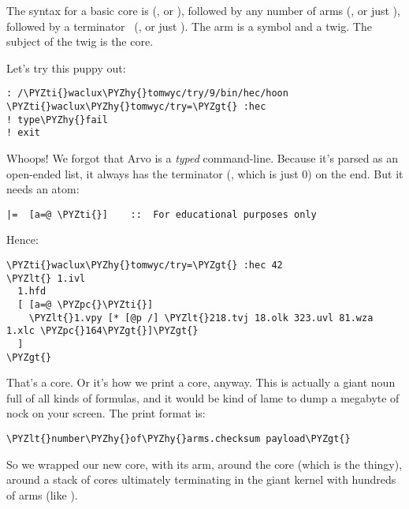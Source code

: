 The syntax for a basic core is \kode{\textbar{}\%} (, or ),
followed by any number of arms \kode{++} (, or just ),
followed by a terminator \phep\ (, or just ).  The arm
is a symbol and a twig.  The subject of the twig is the core.

Let's try this puppy out:

\begin{framed_shaded}
\begin{Verbatim}[fontsize=\relsize{-2.5},fontseries=b,commandchars=\\\{\}]
: /\PYZti{}waclux\PYZhy{}tomwyc/try/9/bin/hec/hoon
\PYZti{}waclux\PYZhy{}tomwyc/try=\PYZgt{} :hec
! type\PYZhy{}fail
! exit
\end{Verbatim}
\end{framed_shaded}
Whoops!  We forgot that Arvo is a \emph{typed} command-line.  Because
it's parsed as an open-ended list, it always has the terminator
(\kode{\sig }, which is just 0) on the end.  But it needs an atom:

\begin{framed_shaded}
\begin{Verbatim}[fontsize=\relsize{-2.5},fontseries=b,commandchars=\\\{\}]
|=  [a=@ \PYZti{}]    ::  For educational purposes only
\end{Verbatim}
\end{framed_shaded}
Hence:

\begin{framed_shaded}
\begin{Verbatim}[fontsize=\relsize{-2.5},fontseries=b,commandchars=\\\{\}]
\PYZti{}waclux\PYZhy{}tomwyc/try=\PYZgt{} :hec 42
\PYZlt{} 1.ivl
  1.hfd
  [ [a=@ \PYZpc{}\PYZti{}]
    \PYZlt{}1.vpy [* [@p /] \PYZlt{}218.tvj 18.olk 323.uvl 81.wza 1.xlc \PYZpc{}164\PYZgt{}]\PYZgt{}
  ]
\PYZgt{}
\end{Verbatim}
\end{framed_shaded}

That's a core.  Or it's how we print a core, anyway.  This is
actually a giant noun full of all kinds of formulas, and it would
be kind of lame to dump a megabyte of nock on your screen.  The
print format is:

\begin{framed_shaded}
\begin{Verbatim}[fontsize=\relsize{-2.5},fontseries=b,commandchars=\\\{\}]
\PYZlt{}number\PYZhy{}of\PYZhy{}arms.checksum payload\PYZgt{}
\end{Verbatim}
\end{framed_shaded}
So we wrapped our new  core, with its  arm,
around the  core (which is the \kode{\textbar{}=  [a=@ \sig ]} thingy),
around a stack of cores ultimately terminating in the giant
kernel with hundreds of arms (like ).

